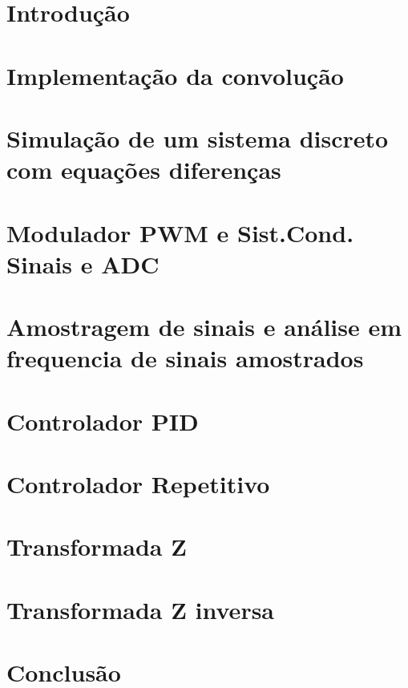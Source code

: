 \documentclass[capchap,sumarioincompleto,a4paper,12pt,ruledheader,normaltoc]{utfprtex}%
\begin{document}
\capa
\newpage
\sumario
\newpage
\newpage

\chapter{Introdução}

\chapter{Implementação da convolução}


\chapter{Simulação de um sistema discreto com equações diferenças}


\chapter{Modulador PWM e Sist.Cond. Sinais e ADC}


\chapter{Amostragem de sinais e análise em frequencia de sinais amostrados}


\chapter{Controlador PID}


\chapter{Controlador Repetitivo}


\chapter{Transformada Z}


\chapter{Transformada Z inversa}


\chapter{Conclusão}



\end{document}
